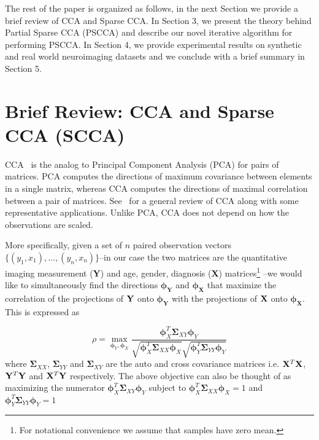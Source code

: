 \documentclass{llncs}
\newcommand{\X}{{\bf X}}
\newcommand{\Y}{{\bf Y}}
\newcommand{\bs}{\boldsymbol}
\newcommand{\bSigma}{\boldsymbol \Sigma}
\begin{document}
The rest of the paper is organized as follows, in the next Section we provide a brief review of CCA and Sparse CCA. In Section 3, we present the theory behind Partial Sparse CCA (PSCCA) and describe our novel iterative algorithm for performing PSCCA. In Section 4, we provide experimental results on synthetic and real world neuroimaging datasets and we conclude with a brief summary in Section 5.




\section{Brief Review: CCA and Sparse CCA (SCCA)}

CCA~\cite{hotellingcca} is the analog to Principal
Component Analysis (PCA) for pairs of matrices. PCA
computes the directions of maximum covariance between elements in a
single matrix, whereas CCA computes the directions of maximal correlation
between a pair of matrices. 
See~\cite{taylor:cca} for a general review of CCA along with some representative applications. 
Unlike PCA, CCA does not depend on how the observations
are scaled.  

More specifically, given a set of $n$ paired observation vectors
$\{(y_1,x_1),...,(y_n,x_n)\}$--in our case the two matrices are the
quantitative imaging measurement ({\Y}) and age, gender, diagnosis ({\X}) matrices\footnote{For
  notational convenience we assume that samples have zero mean.} --we would like to simultaneously find the directions
${\bs{\bs\phi_Y}}$ and
${\bs{\bs\phi_X}}$ that maximize the correlation of
the projections of ${\Y}$ onto ${\bs{\bs\phi_Y}}$
with the projections of ${\X}$ onto
${\bs{\bs\phi_X}}$. This is expressed as

\begin{equation}
\label{cca1}
\rho=\max_{{\bs\phi_Y}, {\bs\phi_X}}
\frac{{\bs\phi_X^T\bSigma_{XY}}\bs\phi_Y}{\sqrt{\bs\phi_X^T\bSigma_{XX}\bs\phi_X}\sqrt{\bs\phi_Y^T\bSigma_{YY}\bs\phi_Y}}
\end{equation}
where ${\bSigma_{XX}}$, ${\bSigma_{YY}}$ and ${\bSigma_{XY}}$ are the auto and cross covariance matrices i.e. $\X^T\X$, $\Y^T\Y$ and $\X^T\Y$ respectively. The above objective can also be thought of as maximizing the numerator $\bs\phi_X^T\bSigma_{XY}\bs\phi_Y$ subject to $\bs\phi_X^T\bSigma_{XX}\bs\phi_X =1$ and $\bs\phi_Y^T\bSigma_{YY}\bs\phi_Y=1$
\end{document}
